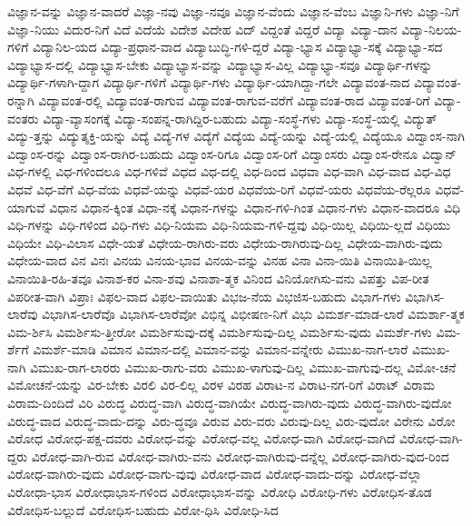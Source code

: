 {ವಿಜ್ಞಾನ-ವನ್ನು
ವಿಜ್ಞಾನ-ವಾದರೆ
ವಿಜ್ಞಾ-ನವು
ವಿಜ್ಞಾ-ನವೂ
ವಿಜ್ಞಾನ-ವೆಂದು
ವಿಜ್ಞಾನ-ವೆಂಬ
ವಿಜ್ಞಾನಿ-ಗಳು
ವಿಜ್ಞಾ-ನಿಗೆ
ವಿಜ್ಞಾ-ನಿಯು
ವಿದುರ-ನಿಗೆ
ವಿದೆ
ವಿದೆಯೆ
ವಿದೇಶ
ವಿದೇಹ
ವಿದ್
ವಿದ್ದಂತೆ
ವಿದ್ದರೆ
ವಿದ್ಯಾ
ವಿದ್ಯಾ-ದಾನ
ವಿದ್ಯಾ-ನಿಲಯ-ಗಳಿಗೆ
ವಿದ್ಯಾನಿಲ-ಯದ
ವಿದ್ಯಾ-ಪ್ರಧಾನ-ವಾದ
ವಿದ್ಯಾಬುದ್ಧಿ-ಗಳಿ-ದ್ದರೆ
ವಿದ್ಯಾ-ಭ್ಯಾಸ
ವಿದ್ಯಾಭ್ಯಾ-ಸಕ್ಕೆ
ವಿದ್ಯಾಭ್ಯಾ-ಸದ
ವಿದ್ಯಾಭ್ಯಾಸ-ದಲ್ಲಿ
ವಿದ್ಯಾಭ್ಯಾಸ-ಬೇಕು
ವಿದ್ಯಾಭ್ಯಾಸ-ವನ್ನು
ವಿದ್ಯಾಭ್ಯಾಸ-ವಿಲ್ಲ
ವಿದ್ಯಾಭ್ಯಾ-ಸವೂ
ವಿದ್ಯಾರ್ಥಿ-ಗಳನ್ನು
ವಿದ್ಯಾರ್ಥಿ-ಗಳಾಗಿ-ದ್ದಾಗ
ವಿದ್ಯಾರ್ಥಿ-ಗಳಿಗೆ
ವಿದ್ಯಾರ್ಥಿ-ಗಳು
ವಿದ್ಯಾರ್ಥಿ-ಯಾಗಿದ್ದಾ-ಗಲೇ
ವಿದ್ಯಾವಂತ-ನಾದ
ವಿದ್ಯಾವಂತ-ರನ್ನಾಗಿ
ವಿದ್ಯಾವಂತ-ರಲ್ಲಿ
ವಿದ್ಯಾವಂತ-ರಾಗುವ
ವಿದ್ಯಾವಂತ-ರಾಗುವ-ವರೆಗೆ
ವಿದ್ಯಾವಂತ-ರಾದ
ವಿದ್ಯಾವಂತ-ರಿಗೆ
ವಿದ್ಯಾ-ವಂತರು
ವಿದ್ಯಾ-ವ್ಯಾಸಂಗಕ್ಕೆ
ವಿದ್ಯಾ-ಸಂಪನ್ನ-ರಾಗಿದ್ದಿರ-ಬಹುದು
ವಿದ್ಯಾ-ಸಂಸ್ಥೆ-ಗಳು
ವಿದ್ಯಾ-ಸಂಸ್ಥೆ-ಯಲ್ಲಿ
ವಿದ್ಯುತ್
ವಿದ್ಯು-ತ್ತನ್ನು
ವಿದ್ಯುತ್ಶಕ್ತಿ-ಯನ್ನು
ವಿದ್ಯೆ
ವಿದ್ಯೆ-ಗಳ
ವಿದ್ಯೆಗೆ
ವಿದ್ಯೆಯ
ವಿದ್ಯೆ-ಯನ್ನು
ವಿದ್ಯೆ-ಯಲ್ಲಿ
ವಿದ್ಯೆಯೂ
ವಿದ್ವಾಂಸ-ನಾಗಿ
ವಿದ್ವಾಂಸ-ರನ್ನು
ವಿದ್ವಾಂಸ-ರಾಗಿರ-ಬಹುದು
ವಿದ್ವಾಂಸ-ರಿಗೂ
ವಿದ್ವಾಂಸ-ರಿಗೆ
ವಿದ್ವಾಂಸರು
ವಿದ್ವಾಂಸ-ರೇನೂ
ವಿದ್ವಾನ್
ವಿಧ-ಗಳಲ್ಲಿ
ವಿಧ-ಗಳಿಂದಲೂ
ವಿಧ-ಗಳಿವೆ
ವಿಧದ
ವಿಧ-ದಲ್ಲಿ
ವಿಧ-ದಿಂದ
ವಿಧವಾ
ವಿಧ-ವಾಗಿ
ವಿಧ-ವಾದ
ವಿಧ-ವಿಧ
ವಿಧವೆ
ವಿಧ-ವೆಗೆ
ವಿಧ-ವೆಯ
ವಿಧವೆ-ಯನ್ನು
ವಿಧವೆ-ಯರ
ವಿಧವೆಯ-ರಿಗೆ
ವಿಧವೆ-ಯರು
ವಿಧವೆಯ-ರೆಲ್ಲರೂ
ವಿಧವೆ-ಯಾಗುವೆ
ವಿಧಾನ
ವಿಧಾನ-ಕ್ಕಿಂತ
ವಿಧಾ-ನಕ್ಕೆ
ವಿಧಾನ-ಗಳನ್ನು
ವಿಧಾನ-ಗಳಿ-ಗಿಂತ
ವಿಧಾನ-ಗಳು
ವಿಧಾನ-ವಾದರೂ
ವಿಧಿ
ವಿಧಿ-ಗಳನ್ನು
ವಿಧಿ-ಗಳಿಂದ
ವಿಧಿ-ಗಳು
ವಿಧಿ-ನಿಯಮ
ವಿಧಿ-ನಿಯಮ-ಗಳಿ-ದ್ದವು
ವಿಧಿ-ಯಿಲ್ಲ
ವಿಧಿಯಿ-ಲ್ಲದೆ
ವಿಧಿಯು
ವಿಧಿಯೇ
ವಿಧಿ-ವಿಲಾಸ
ವಿಧೇ-ಯತೆ
ವಿಧೇಯ-ರಾಗಿರು-ವರು
ವಿಧೇಯ-ರಾಗಿರುವು-ದಿಲ್ಲ
ವಿಧೇಯ-ವಾಗಿರು-ವುದು
ವಿಧೇಯ-ವಾದ
ವಿನ
ವಿನಃ
ವಿನಯ
ವಿನಯ-ಭಾವ
ವಿನಯ-ವನ್ನು
ವಿನಹ
ವಿನಾ
ವಿನಾ-ಯಿತಿ
ವಿನಾಯಿತಿ-ಯಿಲ್ಲ
ವಿನಾಯಿತಿ-ರಹಿ-ತವೂ
ವಿನಾಶ-ಕರ
ವಿನಾ-ಶವು
ವಿನಾಶಾ-ತ್ಮಕ
ವಿನಿಂದ
ವಿನಿಯೋಗಿಸು-ವನು
ವಿಪತ್ತು
ವಿಪ-ರೀತ
ವಿಪರೀತ-ವಾಗಿ
ವಿಪ್ರಾಃ
ವಿಫಲ-ವಾದ
ವಿಫಲ-ವಾಯಿತು
ವಿಭಜ-ನೆಯ
ವಿಭಜಿಸ-ಬಹುದು
ವಿಭಾಗ-ಗಳು
ವಿಭಾಗಿಸ-ಲಾರೆವು
ವಿಭಾಗಿಸ-ಲಾರೆವೊ
ವಿಭಾಗಿಸ-ಲಾರೆವೋ
ವಿಭಿನ್ನ
ವಿಭೀಷಣ-ನಿಗೆ
ವಿಭು
ವಿಮರ್ಶ-ಮಾಡ-ಲಾರೆ
ವಿಮರ್ಶಾ-ತ್ಮಕ
ವಿಮ-ರ್ಶಿಸಿ
ವಿಮರ್ಶಿಸು-ತ್ತೀರೋ
ವಿಮರ್ಶಿಸುವು-ದಕ್ಕೆ
ವಿಮರ್ಶಿಸುವು-ದಿಲ್ಲ
ವಿಮರ್ಶಿಸು-ವುದು
ವಿಮರ್ಶೆ-ಗಳು
ವಿಮ-ರ್ಶೆಗೆ
ವಿಮರ್ಶೆ-ಮಾಡಿ
ವಿಮಾನ
ವಿಮಾನ-ದಲ್ಲಿ
ವಿಮಾನ-ವನ್ನು
ವಿಮಾನ-ವನ್ನೇರು
ವಿಮುಖ-ನಾಗ-ಲಾರೆ
ವಿಮುಖ-ನಾಗಿ
ವಿಮುಖ-ರಾಗ-ಲಾರರು
ವಿಮುಖ-ರಾಗು-ವರು
ವಿಮುಖ-ಳಾಗುವು-ದಿಲ್ಲ
ವಿಮುಖ-ವಾಗುವು-ದಲ್ಲ
ವಿಮೋ-ಚನೆ
ವಿಮೋಚನೆ-ಯನ್ನು
ವಿರ-ಬೇಕು
ವಿರಲಿ
ವಿರ-ಲಿಲ್ಲ
ವಿರಳ
ವಿರಹ
ವಿರಾಟ-ನ
ವಿರಾಟ-ನಗ-ರಿಗೆ
ವಿರಾಟ್
ವಿರಾಮ
ವಿರಾಮ-ದಿಂದಿದೆ
ವಿರಿ
ವಿರುದ್ಧ
ವಿರುದ್ಧ-ವಾಗಿ
ವಿರುದ್ಧ-ವಾಗಿಯೇ
ವಿರುದ್ಧ-ವಾಗಿರು-ವುದು
ವಿರುದ್ಧ-ವಾಗಿರು-ವುದೋ
ವಿರುದ್ಧ-ವಾದ
ವಿರುದ್ಧ-ವಾದು-ದನ್ನು
ವಿರು-ದ್ಧವೂ
ವಿರುವ
ವಿರು-ವರು
ವಿರುವು-ದಿಲ್ಲ
ವಿರು-ವುದೋ
ವಿರೇನು
ವಿರೋ
ವಿರೋಧ
ವಿರೋಧ-ಪಕ್ಷ-ದವರು
ವಿರೋಧ-ವನ್ನು
ವಿರೋಧ-ವಲ್ಲ
ವಿರೋಧ-ವಾಗಿ
ವಿರೋಧ-ವಾಗಿದೆ
ವಿರೋಧ-ವಾಗಿ-ದ್ದರು
ವಿರೋಧ-ವಾಗಿ-ರುವ
ವಿರೋಧ-ವಾಗಿರು-ವನು
ವಿರೋಧ-ವಾಗಿರುವು-ದನ್ನೆಲ್ಲ
ವಿರೋಧ-ವಾಗಿರು-ವುದ-ರಿಂದ
ವಿರೋಧ-ವಾಗಿರು-ವುದು
ವಿರೋಧ-ವಾಗು-ವುವು
ವಿರೋಧ-ವಾದ
ವಿರೋಧ-ವಾದು-ದನ್ನು
ವಿರೋಧ-ವೆಲ್ಲಾ
ವಿರೋಧಾ-ಭಾಸ
ವಿರೋಧಾಭಾಸ-ಗಳಿಂದ
ವಿರೋಧಾಭಾಸ-ವನ್ನು
ವಿರೋಧಿ
ವಿರೋಧಿ-ಗಳು
ವಿರೋಧಿಸ-ತೊಡ
ವಿರೋಧಿಸ-ಬಲ್ಲುದೆ
ವಿರೋಧಿಸ-ಬಹುದು
ವಿರೋ-ಧಿಸಿ
ವಿರೋಧಿ-ಸಿದ
}
